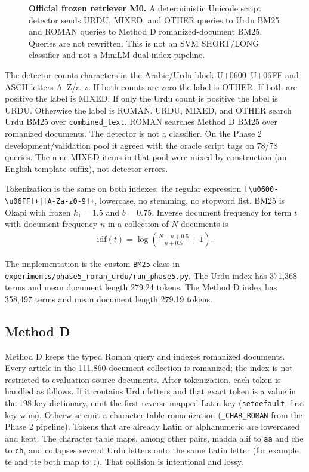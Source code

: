 \documentclass[10pt,letterpaper]{article}
\begin{document}
\begin{figure}[!h]
\caption{\textbf{Official frozen retriever M0.} A deterministic Unicode script detector sends URDU, MIXED, and OTHER queries to Urdu BM25 and ROMAN queries to Method D romanized-document BM25. Queries are not rewritten. This is not an SVM SHORT/LONG classifier and not a MiniLM dual-index pipeline.}
\label{fig1}
\end{figure}

The detector counts characters in the Arabic/Urdu block U+0600--U+06FF and ASCII letters A--Z/a--z. If both counts are zero the label is OTHER. If both are positive the label is MIXED. If only the Urdu count is positive the label is URDU. Otherwise the label is ROMAN. URDU, MIXED, and OTHER search Urdu BM25 over \texttt{combined\_text}. ROMAN searches Method D BM25 over romanized documents. The detector is not a classifier. On the Phase 2 development/validation pool it agreed with the oracle script tags on 78/78 queries. The nine MIXED items in that pool were mixed by construction (an English template suffix), not detector errors.

Tokenization is the same on both indexes: the regular expression \texttt{[\textbackslash u0600-\textbackslash u06FF]+|[A-Za-z0-9]+}, lowercase, no stemming, no stopword list. BM25 is Okapi with frozen $k_1 = 1.5$ and $b = 0.75$. Inverse document frequency for term $t$ with document frequency $n$ in a collection of $N$ documents is
\begin{eqnarray}
\label{eq:idf}
\mathrm{idf}(t) = \log\left(\frac{N - n + 0.5}{n + 0.5} + 1\right).
\end{eqnarray}

The implementation is the custom \texttt{BM25} class in \texttt{experiments/phase5\_roman\_urdu/run\_phase5.py}. The Urdu index has 371,368 terms and mean document length 279.24 tokens. The Method D index has 358,497 terms and mean document length 279.19 tokens.

\subsection*{Method D}

Method D keeps the typed Roman query and indexes romanized documents. Every article in the 111,860-document collection is romanized; the index is not restricted to evaluation source documents. After tokenization, each token is handled as follows. If it contains Urdu letters and that exact token is a value in the 198-key dictionary, emit the first reverse-mapped Latin key (\texttt{setdefault}; first key wins). Otherwise emit a character-table romanization (\texttt{\_CHAR\_ROMAN} from the Phase 2 pipeline). Tokens that are already Latin or alphanumeric are lowercased and kept. The character table maps, among other pairs, madda alif to \texttt{aa} and che to \texttt{ch}, and collapses several Urdu letters onto the same Latin letter (for example te and tte both map to \texttt{t}). That collision is intentional and lossy.
\end{document}

